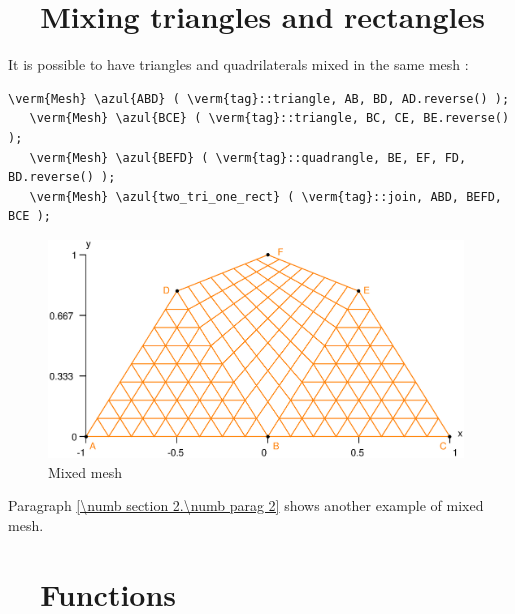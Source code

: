\section{~~Mixing triangles and rectangles}\label{\numb section 1.\numb parag 5}

It is possible to have triangles and quadrilaterals mixed in the same mesh :

\begin{Verbatim}[commandchars=\\\{\},formatcom=\small\tt,frame=single,
   label=main-\ref{\numb section 1.\numb parag 5}.cpp,rulecolor=\color{coment},
   baselinestretch=0.94,framesep=2mm]
   \verm{Mesh} \azul{ABD} ( \verm{tag}::triangle, AB, BD, AD.reverse() );
   \verm{Mesh} \azul{BCE} ( \verm{tag}::triangle, BC, CE, BE.reverse() );
   \verm{Mesh} \azul{BEFD} ( \verm{tag}::quadrangle, BE, EF, FD, BD.reverse() );
   \verm{Mesh} \azul{two_tri_one_rect} ( \verm{tag}::join, ABD, BEFD, BCE );
\end{Verbatim}

\begin{figure}[ht] \centering
  \includegraphics[width=110mm]{two-tri-one-rect}
  \caption{Mixed mesh}
  \label{\numb section 1.\numb fig 8}
\end{figure}

Paragraph \ref{\numb section 2.\numb parag 2} shows another example of mixed mesh.


\section{~~Functions}\label{\numb section 1.\numb parag 6}

